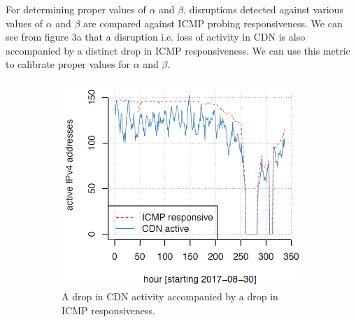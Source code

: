 \documentclass[11pt,twoside,a4paper]{article}
\begin{document}
For determining proper values of $\alpha$ and $\beta$, disruptions detected against various values of $\alpha$ and $\beta$ are compared against ICMP probing responsiveness. We can see from figure 3a that a disruption i.e. loss of activity in CDN is also accompanied by a distinct drop in ICMP responsiveness. We can use this metric to calibrate proper values for $\alpha$ and $\beta$.
\begin{figure}[h!]
  
  \begin{subfigure}[b]{80mm}
    \includegraphics[width=\linewidth]{Figures/3a.png}
    \caption{A drop in CDN activity accompanied by a drop in ICMP responsiveness.\newline\newline}
  \end{subfigure}
  \begin{subfigure}[b]{75mm}  \hspace{5mm}
    {}

\end{subfigure}
\end{figure}
\end{document}
